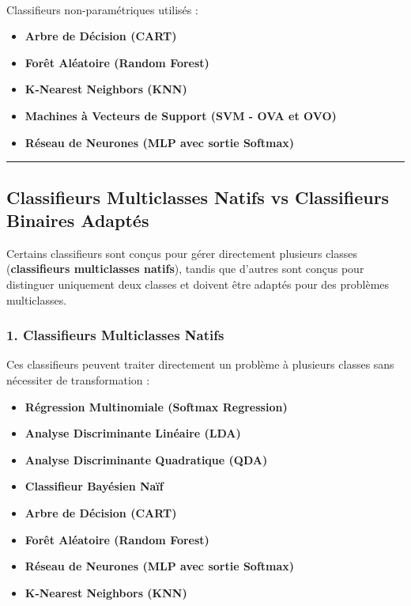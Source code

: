 \documentclass[
  letterpaper,
  DIV=11,
  numbers=noendperiod]{scrartcl}
\makeatletter
\let\oldparagraph\paragraph
\renewcommand{\paragraph}{
    \@ifstar
      \xxxParagraphStar
      \xxxParagraphNoStar
  }
\newcommand{\xxxParagraphStar}[1]{\oldparagraph*{#1}\mbox{}}
\newcommand{\xxxParagraphNoStar}[1]{\oldparagraph{#1}\mbox{}}
\providecommand{\tightlist}{%
  \setlength{\itemsep}{0pt}\setlength{\parskip}{0pt}}\usepackage{longtable,booktabs,array}
\makeatother
\begin{document}
\paragraph{Classifieurs non-paramétriques utilisés
:}\label{classifieurs-non-paramuxe9triques-utilisuxe9s}

\begin{itemize}
\tightlist
\item
  \textbf{Arbre de Décision (CART)}
\item
  \textbf{Forêt Aléatoire (Random Forest)}
\item
  \textbf{K-Nearest Neighbors (KNN)}
\item
  \textbf{Machines à Vecteurs de Support (SVM - OVA et OVO)}
\item
  \textbf{Réseau de Neurones (MLP avec sortie Softmax)}
\end{itemize}

\begin{center}\rule{0.5\linewidth}{0.5pt}\end{center}

\subsection{Classifieurs Multiclasses Natifs vs Classifieurs Binaires
Adaptés}\label{classifieurs-multiclasses-natifs-vs-classifieurs-binaires-adaptuxe9s}

Certains classifieurs sont conçus pour gérer directement plusieurs
classes (\textbf{classifieurs multiclasses natifs}), tandis que d'autres
sont conçus pour distinguer uniquement deux classes et doivent être
adaptés pour des problèmes multiclasses.

\subsubsection{1. Classifieurs Multiclasses
Natifs}\label{classifieurs-multiclasses-natifs}

Ces classifieurs peuvent traiter directement un problème à plusieurs
classes sans nécessiter de transformation :

\begin{itemize}
\tightlist
\item
  \textbf{Régression Multinomiale (Softmax Regression)}
\item
  \textbf{Analyse Discriminante Linéaire (LDA)}
\item
  \textbf{Analyse Discriminante Quadratique (QDA)}
\item
  \textbf{Classifieur Bayésien Naïf}
\item
  \textbf{Arbre de Décision (CART)}
\item
  \textbf{Forêt Aléatoire (Random Forest)}
\item
  \textbf{Réseau de Neurones (MLP avec sortie Softmax)}
\item
  \textbf{K-Nearest Neighbors (KNN)}
\end{itemize}
\end{document}
